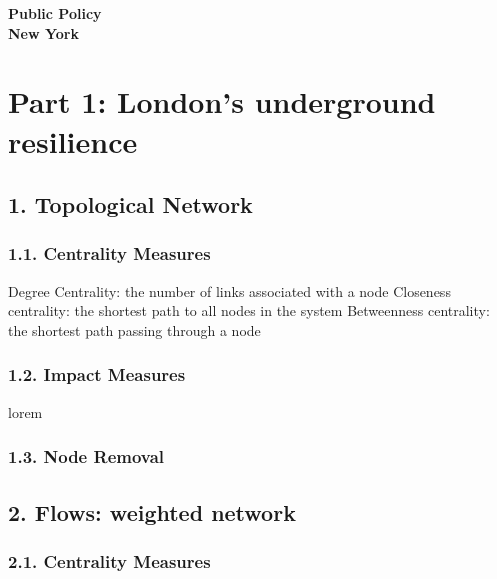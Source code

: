 \documentclass[10pt]{report}
\author{the author}
\numberwithin{figure}{section}
\numberwithin{table}{section}
\begin{document}

\begin{center}
    \vspace*{-3cm}
\end{center}   
    {\LARGE\textbf{Public Policy\\
    New York\\}}
    

\section{Part 1: London’s underground resilience}


 \subsection{1. Topological Network}
\subsubsection{1.1. Centrality Measures } 
        Degree Centrality: the number of links associated with a node 
        Closeness centrality:  the shortest path to all nodes in the system
        Betweenness centrality: the shortest path passing through a node

\subsubsection{1.2. Impact Measures} 
lorem

\subsubsection{1.3. Node Removal} 

\subsection{2. Flows: weighted network} 

\subsubsection{2.1. Centrality Measures } 
\end{document}
